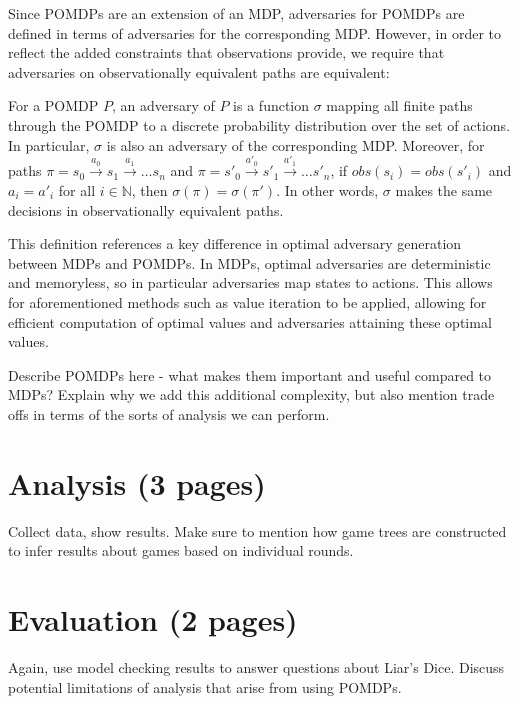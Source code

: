Since POMDPs are an extension of an MDP, adversaries for POMDPs are defined in terms of adversaries for the corresponding MDP. However, in order to reflect the added constraints that observations provide, we require that adversaries on observationally equivalent paths are equivalent:

\begin{definition}
\label{cs1:pomdp_strats}

For a POMDP $P$, an adversary of $P$ is a function $\sigma$ mapping all finite paths through the POMDP to a discrete probability distribution over the set of actions. In particular, $\sigma$ is also an adversary of the corresponding MDP. Moreover, for paths $\pi = s_0 \xrightarrow{a_0} s_1 \xrightarrow{a_1} \dots s_n$ and $\pi = s'_0 \xrightarrow{a'_0} s'_1 \xrightarrow{a'_1} \dots s'_n$, if $obs(s_i) = obs(s'_i)$ and $a_i = a'_i$ for all $i \in \mathbb{N}$, then $\sigma(\pi) = \sigma(\pi')$. In other words, $\sigma$ makes the same decisions in observationally equivalent paths.

\end{definition}

This definition references a key difference in optimal adversary generation between MDPs and POMDPs. In MDPs, optimal adversaries are deterministic and memoryless, so in particular adversaries map states to actions. This allows for aforementioned methods such as value iteration to be applied, allowing for efficient computation of optimal values and adversaries attaining these optimal values.





Describe POMDPs here - what makes them important and useful compared to MDPs? Explain why we add this additional complexity, but also mention trade offs in terms of the sorts of analysis we can perform.


\section{Analysis (3 pages)}

Collect data, show results. Make sure to mention how game trees are constructed to infer results about games based on individual rounds.


\section{Evaluation (2 pages)}

Again, use model checking results to answer questions about Liar's Dice. Discuss potential limitations of analysis that arise from using POMDPs.

